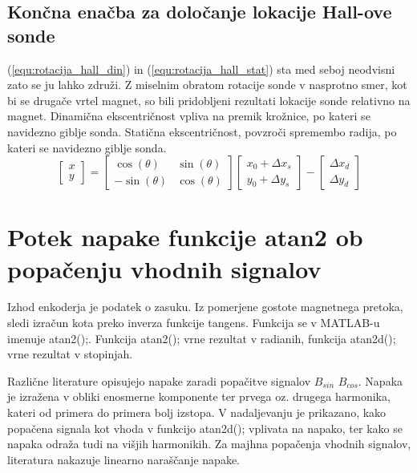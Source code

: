 \section{Končna enačba za določanje lokacije Hall-ove sonde}
(\ref{equ:rotacija_hall_din}) in (\ref{equ:rotacija_hall_stat}) sta med seboj neodvisni zato se ju lahko združi. 
Z miselnim obratom rotacije sonde v nasprotno smer, kot bi se drugače vrtel magnet, so bili pridobljeni rezultati lokacije sonde relativno na magnet.
Dinamična ekscentričnost vpliva na premik krožnice, po kateri se navidezno giblje sonda. Statična ekscentričnost, povzroči spremembo radija, po kateri se navidezno giblje sonda.
\begin{equation}
\label{equ:rotacija_hall_koncna}
\begin{bmatrix} x\\y \end{bmatrix}=
\begin{bmatrix} \cos(\theta)&\sin(\theta)\\-\sin(\theta)&\cos(\theta) \end{bmatrix}
\begin{bmatrix} x_0+\Delta x_s\\y_0+\Delta y_s \end{bmatrix}-
\begin{bmatrix} \Delta x_d\\\Delta y_d \end{bmatrix}
\end{equation}
%
%
\chapter{Potek napake funkcije atan2 ob popačenju vhodnih signalov}
Izhod enkoderja je podatek o zasuku. Iz pomerjene gostote magnetnega pretoka, sledi izračun kota preko inverza funkcije tangens. Funkcija se v MATLAB-u imenuje atan2();. Funkcija atan2(); vrne rezultat v radianih,
funkcija atan2d(); vrne rezultat v stopinjah\cite{atan2Matlab}\cite{atan2dMatlab}.

Različne literature \cite{RLS3} \cite{osnova} \cite{RLS1} \cite{RLS2} opisujejo napake zaradi popačitve signalov $B_{sin}$ $B_{cos}$. Napaka je izražena v obliki enosmerne komponente ter prvega oz. drugega
harmonika, kateri od primera do primera bolj izstopa. V nadaljevanju je prikazano, kako popačena signala kot vhoda v funkcijo atan2d(); vplivata na napako, ter kako se napaka odraža tudi na višjih harmonikih. Za
majhna popačenja vhodnih signalov, literatura nakazuje linearno naraščanje napake.
